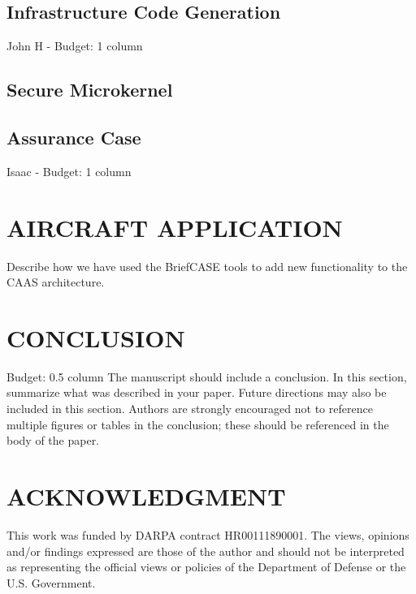 \documentclass{IEEEcsmag}
\begin{document}
\subsection{Infrastructure Code Generation}
John H -  Budget: 1 column



\subsection{Secure Microkernel}


\subsection{Assurance Case}
Isaac -  Budget: 1 column
\cite{resolute-destion}



\section{AIRCRAFT APPLICATION}


Describe how we have used the BriefCASE tools to add new functionality to the CAAS architecture.  

\section{CONCLUSION}
 Budget: 0.5 column
The manuscript should include a conclusion. In this section, summarize what was described in your paper. Future directions may also be included in this section. Authors are strongly encouraged not to reference multiple figures or tables in the conclusion; these should be referenced in the body of the paper.

\section{ACKNOWLEDGMENT}

This work was funded by DARPA contract HR00111890001. The
views, opinions and/or findings expressed are those of the author
and should not be interpreted as representing the official views or
policies of the Department of Defense or the U.S. Government.





\end{document}
